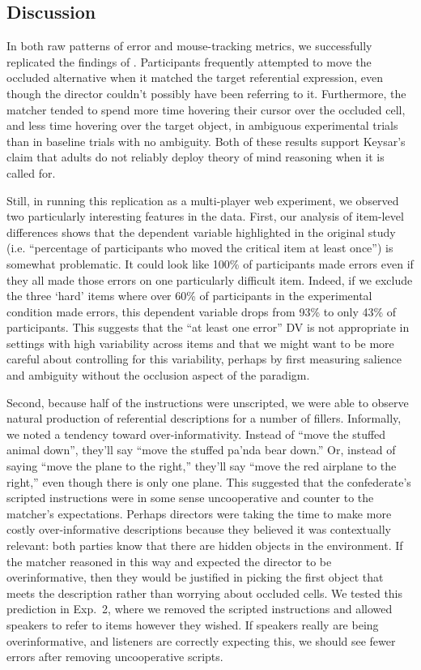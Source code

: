 \documentclass[10pt,letterpaper]{article}
\begin{document}
\subsection{Discussion}

In both raw patterns of error and mouse-tracking metrics, we successfully replicated the findings of . Participants frequently attempted to move the occluded alternative when it matched the target referential expression, even though the director couldn't possibly have been referring to it. Furthermore, the matcher tended to spend more time hovering their cursor over the occluded cell, and less time hovering over the target object, in ambiguous experimental trials than in baseline trials with no ambiguity. Both of these results support Keysar's claim that adults do not reliably deploy theory of mind reasoning when it is called for.

Still, in running this replication as a multi-player web experiment, we observed two particularly interesting features in the data. First, our analysis of item-level differences shows that the dependent variable highlighted in the original study (i.e. ``percentage of participants who moved the critical item at least once'') is somewhat problematic. It could look like 100\% of participants made errors even if they all made those errors on one particularly difficult item. Indeed, if we exclude the three `hard' items where over 60\% of participants in the experimental condition made errors, this dependent variable drops from 93\% to only 43\% of participants. This suggests that the ``at least one error'' DV is not appropriate in settings with high variability across items and that we might want to be more careful about controlling for this variability, perhaps by first measuring salience and ambiguity without the occlusion aspect of the paradigm.

Second, because half of the instructions were unscripted, we were able to observe natural production of referential descriptions for a number of fillers. Informally, we noted a tendency toward over-informativity. Instead of ``move the stuffed animal down'', they'll say ``move the stuffed pa'nda bear down.'' Or, instead of saying ``move the plane to the right,'' they'll say ``move the red airplane to the right,'' even though there is only one plane. This suggested that the confederate's scripted instructions were in some sense uncooperative and counter to the matcher's expectations. Perhaps directors were taking the time to make more costly over-informative descriptions because they believed it was contextually relevant: both parties know that there are hidden objects in the environment. If the matcher reasoned in this way and expected the director to be overinformative, then they would be justified in picking the first object that meets the description rather than worrying about occluded cells. We tested this prediction in Exp.~2, where we removed the scripted instructions and allowed speakers to refer to items however they wished. If speakers really are being overinformative, and listeners are correctly expecting this, we should see fewer errors after removing uncooperative scripts.
\end{document}
